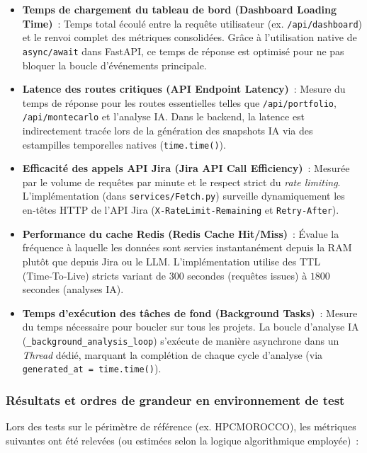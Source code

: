 \begin{itemize}
    \renewcommand{\labelitemi}{—}
    \item \textbf{Temps de chargement du tableau de bord (Dashboard Loading Time)}~: Temps total écoulé entre la requête utilisateur (ex. \texttt{/api/dashboard}) et le renvoi complet des métriques consolidées. Grâce à l’utilisation native de \texttt{async/await} dans FastAPI, ce temps de réponse est optimisé pour ne pas bloquer la boucle d’événements principale.
    
    \item \textbf{Latence des routes critiques (API Endpoint Latency)}~: Mesure du temps de réponse pour les routes essentielles telles que \texttt{/api/portfolio}, \texttt{/api/montecarlo} et l’analyse IA. Dans le backend, la latence est indirectement tracée lors de la génération des snapshots IA via des estampilles temporelles natives (\texttt{time.time()}).
    
    \item \textbf{Efficacité des appels API Jira (Jira API Call Efficiency)}~: Mesurée par le volume de requêtes par minute et le respect strict du \textit{rate limiting}. L’implémentation (dans \texttt{services/Fetch.py}) surveille dynamiquement les en‑têtes HTTP de l’API Jira (\texttt{X-RateLimit-Remaining} et \texttt{Retry-After}).
    
    \item \textbf{Performance du cache Redis (Redis Cache Hit/Miss)}~: Évalue la fréquence à laquelle les données sont servies instantanément depuis la RAM plutôt que depuis Jira ou le LLM. L’implémentation utilise des TTL (Time‑To‑Live) stricts variant de $300$ secondes (requêtes issues) à $1800$ secondes (analyses IA).
    
    \item \textbf{Temps d’exécution des tâches de fond (Background Tasks)}~: Mesure du temps nécessaire pour boucler sur tous les projets. La boucle d’analyse IA (\texttt{\_background\_analysis\_loop}) s’exécute de manière asynchrone dans un \textit{Thread} dédié, marquant la complétion de chaque cycle d’analyse (via \texttt{generated\_at = time.time()}).
\end{itemize}

\subsubsection{Résultats et ordres de grandeur en environnement de test}

Lors des tests sur le périmètre de référence (ex. HPCMOROCCO), les métriques suivantes ont été relevées (ou estimées selon la logique algorithmique employée)~:

